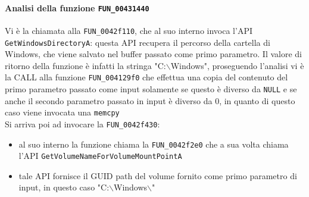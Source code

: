 \documentclass[12pt]{extarticle}
\begin{document}
\paragraph{Analisi della funzione \texttt{FUN\_00431440}} 
Vi è la chiamata alla \texttt{FUN\_0042f110}, che al suo interno invoca l'API \texttt{GetWindowsDirectoryA}: questa API recupera il percorso della cartella di Windows, che viene salvato nel buffer passato come primo parametro. Il valore di ritorno della funzione è infatti la stringa "C:$\backslash$Windows", proseguendo l'analisi vi è la CALL alla funzione \texttt{FUN\_004129f0} che effettua una copia del contenuto del primo parametro passato come input solamente se questo è diverso da \texttt{NULL} e se anche il secondo parametro passato in input è diverso da 0, in quanto di questo caso viene invocata una \texttt{memcpy}\\Si arriva poi ad invocare la \texttt{FUN\_0042f430}:
\begin{itemize}
    \item al suo interno la funzione chiama la \texttt{FUN\_0042f2e0} che a sua volta chiama l'API \texttt{GetVolumeNameForVolumeMountPointA}
    \item tale API fornisce il GUID path del volume fornito come primo parametro di input, in questo caso "C:$\backslash$Windows$\backslash$"
\end{itemize}
\end{document}
